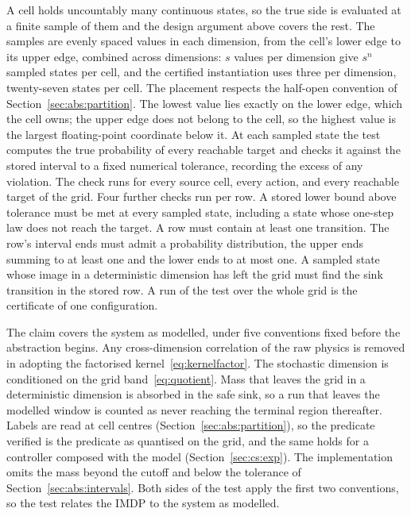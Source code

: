 \documentclass[11pt,a4paper]{article}
\theoremstyle{plain}
\theoremstyle{remark}
\begin{document}
	A cell holds uncountably many continuous states, so the true side
	is evaluated at a finite sample of them and the design argument
	above covers the rest. The samples are evenly spaced values in
	each dimension, from the cell's lower edge to its upper edge,
	combined across dimensions: $s$ values per dimension give $s^n$
	sampled states per cell, and the certified instantiation uses
	three per dimension, twenty-seven states per cell. The placement
	respects the half-open convention of
	Section~\ref{sec:abs:partition}. The lowest value lies exactly on
	the lower edge, which the cell owns; the upper edge does not
	belong to the cell, so the highest value is the largest
	floating-point coordinate below it. At each sampled state the
	test computes the true probability of every reachable target and
	checks it against the stored interval to a fixed numerical
	tolerance, recording the excess of any violation. The check runs
	for every source cell, every action, and every reachable target
	of the grid. Four further checks run per row. A stored lower
	bound above tolerance must be met at every sampled state,
	including a state whose one-step law does not reach the target. A
	row must contain at least one transition. The row's interval ends
	must admit a probability distribution, the upper ends summing to
	at least one and the lower ends to at most one. A sampled state
	whose image in a deterministic dimension has left the grid must
	find the sink transition in the stored row. A run of the test
	over the whole grid is the certificate of one configuration.
	
	\begin{notebox}[title=Scope of the soundness claim]
		The claim covers the system as modelled, under five
		conventions fixed before the abstraction begins. Any
		cross-dimension correlation of the raw physics is removed in
		adopting the factorised kernel~\eqref{eq:kernelfactor}. The
		stochastic dimension is conditioned on the grid
		band~\eqref{eq:quotient}. Mass that leaves the grid in a
		deterministic dimension is absorbed in the safe sink, so a
		run that leaves the modelled window is counted as never
		reaching the terminal region thereafter. Labels are read at
		cell centres (Section~\ref{sec:abs:partition}), so the
		predicate verified is the predicate as quantised on the grid,
		and the same holds for a controller composed with the model
		(Section~\ref{sec:cs:exp}). The implementation omits the mass
		beyond the cutoff and below the tolerance of
		Section~\ref{sec:abs:intervals}. Both sides of the test apply
		the first two conventions, so the test relates the IMDP to
		the system as modelled.
	\end{notebox}
	
\end{document}
